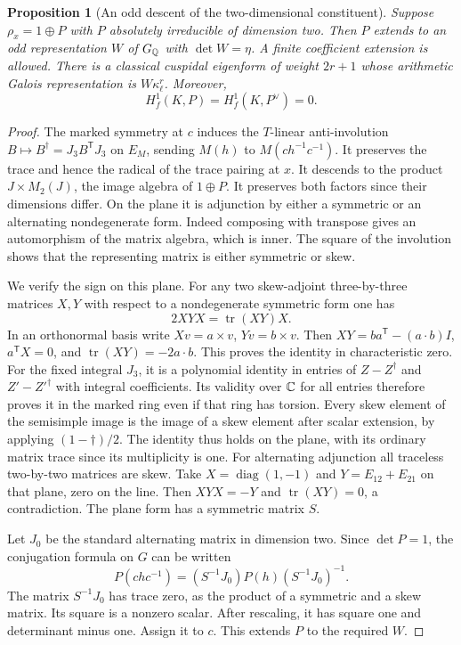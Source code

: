 \documentclass[a4paper,11pt]{article}
\newtheorem{proposition}{Proposition}[section]
\theoremstyle{definition}
\theoremstyle{remark}
\numberwithin{equation}{section}
\begin{document}
\begin{proposition}[An odd descent of the two-dimensional constituent]
\label{prop:odddescent376}
Suppose \(\rho_x=1\oplus P\) with \(P\) absolutely
irreducible of dimension two. Then \(P\) extends to an odd
representation \(W\) of \(G_\mathbb Q\) with \(\det W=\eta\).
A finite coefficient extension is allowed. There is a
classical cuspidal eigenform of weight \(2r+1\) whose
arithmetic Galois representation is \(W\kappa_\ell^r\).
Moreover,
\[
                        H_f^1(K,P)=H_f^1(K,P^\vee)=0.
\]
\end{proposition}
\begin{proof}
The marked symmetry at \(c\) induces the \(T\)-linear
anti-involution \(B\mapsto B^\dagger=J_3B^{\mathsf T}J_3\)
on \(E_M\), sending \(M(h)\) to \(M(ch^{-1}c^{-1})\).
It preserves the trace and hence the radical of the trace
pairing at \(x\). It descends to the product
\(J\times M_2(J)\), the image algebra of \(1\oplus P\).
It preserves both factors since their dimensions differ.
On the plane it is adjunction by either a symmetric or an
alternating nondegenerate form. Indeed composing with
transpose gives an automorphism of the matrix algebra,
which is inner. The square of the involution shows that
the representing matrix is either symmetric or skew.

We verify the sign on this plane. For any two skew-adjoint
three-by-three matrices \(X,Y\) with respect to a nondegenerate
symmetric form one has
\[
                        2XYX=\operatorname{tr}(XY)X .
\]
In an orthonormal basis write \(Xv=a\times v\), \(Yv=b\times v\).
Then \(XY=ba^{\mathsf T}-(a\cdot b)I\),
\(a^{\mathsf T}X=0\), and \(\operatorname{tr}(XY)=-2a\cdot b\).
This proves the identity in characteristic zero. For the
fixed integral \(J_3\), it is a polynomial identity in
entries of \(Z-Z^\dagger\) and \(Z'-Z'^\dagger\) with integral
coefficients. Its validity over \(\mathbb C\) for all entries
therefore proves it in the marked ring even if that ring
has torsion. Every skew element of the semisimple image
is the image of a skew element after scalar extension,
by applying \((1-\dagger)/2\). The identity thus holds on
the plane, with its ordinary matrix trace since its
multiplicity is one. For alternating adjunction all traceless
two-by-two matrices are skew. Take \(X=\operatorname{diag}(1,-1)\)
and \(Y=E_{12}+E_{21}\) on that plane, zero on the line.
Then \(XYX=-Y\) and \(\operatorname{tr}(XY)=0\), a contradiction.
The plane form has a symmetric matrix \(S\).

Let \(J_0\) be the standard alternating matrix in dimension
two. Since \(\det P=1\), the conjugation formula on \(G\)
can be written
\[
 P(chc^{-1})=(S^{-1}J_0)P(h)(S^{-1}J_0)^{-1}.
\]
The matrix \(S^{-1}J_0\) has trace zero, as the product of
a symmetric and a skew matrix. Its square is a nonzero scalar.
After rescaling, it has square one and determinant minus one.
Assign it to \(c\). This extends \(P\) to the required \(W\).


\end{proof}
\end{document}
